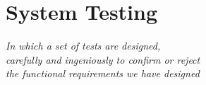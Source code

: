 \chapter{System Testing}\label{ch:sys-test}

\begin{flushright}{\slshape
    In which a set of tests are designed,\\
    carefully and ingeniously to confirm or reject\\
    the functional requirements we have designed
}
\end{flushright}
